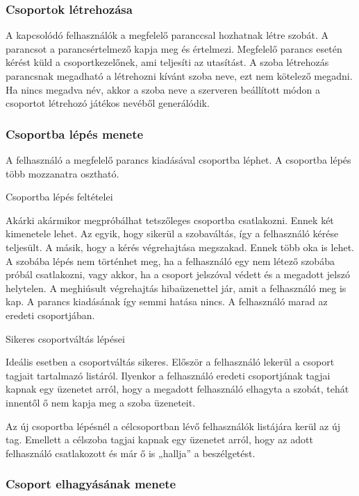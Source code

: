 \documentclass[bibliography=totocnumbered]{article}
\begin{document}
\subsubsection{Csoportok
létrehozása}

A kapcsolódó felhasználók a megfelelő paranccsal hozhatnak létre szobát.
A parancsot a parancsértelmező kapja meg és értelmezi. Megfelelő parancs
esetén kérést küld a csoportkezelőnek, ami teljesíti az utasítást. A
szoba létrehozás parancsnak megadható a létrehozni kívánt szoba neve,
ezt nem kötelező megadni. Ha nincs megadva név, akkor a szoba neve a
szerveren beállított módon a csoportot létrehozó játékos nevéből
generálódik.


\subsubsection{Csoportba lépés
menete}

A felhasználó a megfelelő parancs kiadásával csoportba léphet. A
csoportba lépés több mozzanatra osztható.

Csoportba lépés feltételei

Akárki akármikor megpróbálhat tetszőleges csoportba csatlakozni. Ennek
két kimenetele lehet. Az egyik, hogy sikerül a szobaváltás, így a
felhasználó kérése teljesült. A másik, hogy a kérés végrehajtása
megszakad. Ennek több oka is lehet. A szobába lépés nem történhet meg,
ha a felhasználó egy nem létező szobába próbál csatlakozni, vagy akkor,
ha a csoport jelszóval védett és a megadott jelszó helytelen. A
meghiúsult végrehajtás hibaüzenettel jár, amit a felhasználó meg is kap.
A parancs kiadásának így semmi hatása nincs. A felhasználó marad az
eredeti csoportjában.

Sikeres csoportváltás lépései

Ideális esetben a csoportváltás sikeres. Először a felhasználó lekerül a
csoport tagjait tartalmazó listáról. Ilyenkor a felhasználó eredeti
csoportjának tagjai kapnak egy üzenetet arról, hogy a megadott
felhasználó elhagyta a szobát, tehát innentől ő nem kapja meg a szoba
üzeneteit.

Az új csoportba lépésnél a célcsoportban lévő felhasználók listájára
kerül az új tag. Emellett a célszoba tagjai kapnak egy üzenetet arról,
hogy az adott felhasználó csatlakozott és már ő is „hallja'' a
beszélgetést.


\subsubsection{Csoport elhagyásának
menete}
\end{document}
